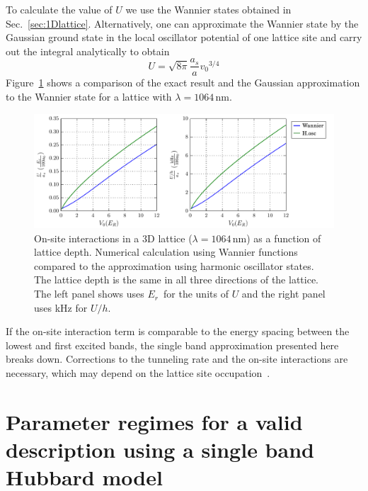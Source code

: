 \documentclass[oneside,11pt]{memoir}
\newcommand{\vvo}{\ensuremath{v_{0}}}
\newcommand{\er}{\ensuremath{E_{r}}}
\begin{document}
To calculate the value of $U$ we use the Wannier states obtained in
Sec.~\ref{sec:1Dlattice}.  Alternatively, one can approximate the Wannier state
by the Gaussian ground state in the local oscillator potential of one lattice
site and carry out the integral analytically to obtain~\cite{Bloch2008} 
\begin{equation} 
  U  = \sqrt{ 8\pi } \frac{a_{s}}{a} \vvo^{3/4} 
\end{equation} 
Figure~\ref{fig:wfactor} shows a comparison of the exact result and the
Gaussian approximation to the Wannier state for a lattice with
$\lambda=1064$\,nm. 
\begin{figure}
\centering
\includegraphics[width=\textwidth]{../figures/BandStructure_figures/wFactor_V0_a0.pdf}
\caption[On-site interactions in a 3D lattice]{\small On-site interactions in a
3D lattice ($\lambda=1064\,\text{nm}$) as a function of lattice depth.
Numerical calculation using Wannier functions compared to the approximation
using harmonic oscillator states.  The lattice depth is the same in all three
directions of the lattice.   The left panel shows uses \er\ for the units of $U$ 
and the right panel uses kHz for $U/h$. }
\label{fig:wfactor}
\end{figure}

If the on-site interaction term is comparable to the energy spacing between the
lowest and first excited bands, the single band approximation presented here
breaks down.  Corrections to the tunneling rate and the on-site interactions
are necessary, which may depend on the lattice site
occupation~\cite{Werner2005,Jordens2010,Mark2012}.

\section{Parameter regimes for a valid description using a single band
Hubbard model}
\end{document}
